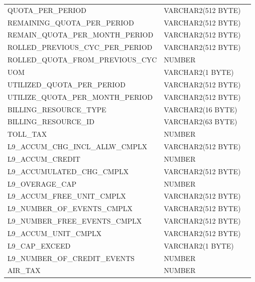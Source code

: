 \documentclass[12pt,twoside]{article}
\begin{document}
\begin{longtable}{lll}
 QUOTA\_PER\_PERIOD                   &  VARCHAR2(512 BYTE)   &               \\
 REMAINING\_QUOTA\_PER\_PERIOD        &  VARCHAR2(512 BYTE)   &               \\
 REMAIN\_QUOTA\_PER\_MONTH\_PERIOD    &  VARCHAR2(512 BYTE)   &               \\
 ROLLED\_PREVIOUS\_CYC\_PER\_PERIOD   &  VARCHAR2(512 BYTE)   &               \\
 ROLLED\_QUOTA\_FROM\_PREVIOUS\_CYC   &  NUMBER               &               \\
 UOM                                  &  VARCHAR2(1 BYTE)     &               \\
 UTILIZED\_QUOTA\_PER\_PERIOD         &  VARCHAR2(512 BYTE)   &               \\
 UTILIZE\_QUOTA\_PER\_MONTH\_PERIOD   &  VARCHAR2(512 BYTE)   &               \\
 BILLING\_RESOURCE\_TYPE              &  VARCHAR2(16 BYTE)    &               \\
 BILLING\_RESOURCE\_ID                &  VARCHAR2(63 BYTE)    &               \\
 TOLL\_TAX                            &  NUMBER               &               \\
 L9\_ACCUM\_CHG\_INCL\_ALLW\_CMPLX    &  VARCHAR2(512 BYTE)   &               \\
 L9\_ACCUM\_CREDIT                    &  NUMBER               &               \\
 L9\_ACCUMULATED\_CHG\_CMPLX          &  VARCHAR2(512 BYTE)   &               \\
 L9\_OVERAGE\_CAP                     &  NUMBER               &               \\
 L9\_ACCUM\_FREE\_UNIT\_CMPLX         &  VARCHAR2(512 BYTE)   &               \\
 L9\_NUMBER\_OF\_EVENTS\_CMPLX        &  VARCHAR2(512 BYTE)   &               \\
 L9\_NUMBER\_FREE\_EVENTS\_CMPLX      &  VARCHAR2(512 BYTE)   &               \\
 L9\_ACCUM\_UNIT\_CMPLX               &  VARCHAR2(512 BYTE)   &               \\
 L9\_CAP\_EXCEED                      &  VARCHAR2(1 BYTE)     &               \\
 L9\_NUMBER\_OF\_CREDIT\_EVENTS       &  NUMBER               &               \\
 AIR\_TAX                             &  NUMBER               &               \\

\end{longtable}
\end{document}

